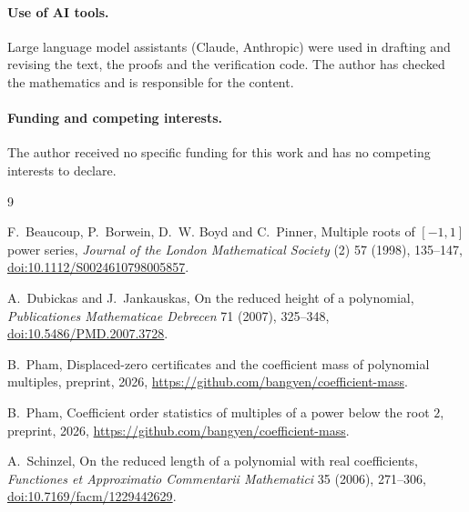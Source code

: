 \documentclass[11pt]{article}
\begin{document}
\paragraph{Use of AI tools.}
Large language model assistants (Claude, Anthropic) were used in drafting
and revising the text, the proofs and the verification code. The author has checked the mathematics and is responsible
for the content.

\paragraph{Funding and competing interests.}
The author received no specific funding for this work and has no competing
interests to declare.

\begin{thebibliography}{9}

F.~Beaucoup, P.~Borwein, D.~W. Boyd and C.~Pinner,
\newblock Multiple roots of $[-1,1]$ power series,
\newblock \emph{Journal of the London Mathematical Society} (2) 57 (1998), 135--147,
\newblock \href{https://doi.org/10.1112/S0024610798005857}
{doi:10.1112/S0024610798005857}.

A.~Dubickas and J.~Jankauskas,
\newblock On the reduced height of a polynomial,
\newblock \emph{Publicationes Mathematicae Debrecen} 71 (2007), 325--348,
\newblock \href{https://doi.org/10.5486/PMD.2007.3728}
{doi:10.5486/PMD.2007.3728}.

B.~Pham,
\newblock Displaced-zero certificates and the coefficient mass of polynomial
multiples,
\newblock preprint, 2026, \url{https://github.com/bangyen/coefficient-mass}.

B.~Pham,
\newblock Coefficient order statistics of multiples of a power below the
root $2$,
\newblock preprint, 2026, \url{https://github.com/bangyen/coefficient-mass}.

A.~Schinzel,
\newblock On the reduced length of a polynomial with real coefficients,
\newblock \emph{Functiones et Approximatio Commentarii Mathematici} 35
(2006), 271--306,
\newblock \href{https://doi.org/10.7169/facm/1229442629}
{doi:10.7169/facm/1229442629}.

\end{thebibliography}
\end{document}
